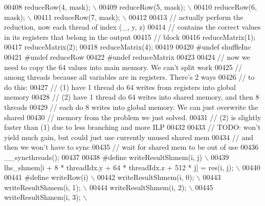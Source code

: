 \begin{DoxyCode}
00408 \textcolor{preprocessor}{  reduceRow(4, mask);                           \(\backslash\)}
00409 \textcolor{preprocessor}{  reduceRow(5, mask);                           \(\backslash\)}
00410 \textcolor{preprocessor}{  reduceRow(6, mask);                           \(\backslash\)}
00411 \textcolor{preprocessor}{  reduceRow(7, mask);                           \(\backslash\)}
00412 \textcolor{preprocessor}{}
00413   \textcolor{comment}{// actually perform the reduction, now each thread of index (\_, y, z)}
00414   \textcolor{comment}{// contains the correct values in its registers that belong in the output}
00415   \textcolor{comment}{// block}
00416   reduceMatrix(1);
00417   reduceMatrix(2);
00418   reduceMatrix(4);
00419 
00420 \textcolor{preprocessor}{#undef shuffleInc}
00421 \textcolor{preprocessor}{#undef reduceRow}
00422 \textcolor{preprocessor}{#undef reduceMatrix}
00423 
00424   \textcolor{comment}{// now we need to copy the 64 values into main memory. We can't split work}
00425   \textcolor{comment}{// among threads because all variables are in registers. There's 2 ways}
00426   \textcolor{comment}{// to do this:}
00427   \textcolor{comment}{// (1) have 1 thread do 64 writes from registers into global memory}
00428   \textcolor{comment}{// (2) have 1 thread do 64 writes into shared memory, and then 8 threads}
00429   \textcolor{comment}{//     each do 8 writes into global memory. We can just overwrite the shared}
00430   \textcolor{comment}{//     memory from the problem we just solved.}
00431   \textcolor{comment}{// (2) is slightly faster than (1) due to less branching and more ILP}
00432 
00433   \textcolor{comment}{// TODO: won't yield much gain, but could just use currently unused shared mem}
00434   \textcolor{comment}{//       and then we won't have to sync}
00435   \textcolor{comment}{// wait for shared mem to be out of use}
00436   \_\_syncthreads();
00437 
00438 \textcolor{preprocessor}{#define writeResultShmem(i, j)                                          \(\backslash\)}
00439 \textcolor{preprocessor}{  lhs\_shmem[i + 8 * threadIdx.y + 64 * threadIdx.z + 512 * j] = res(i, j); \(\backslash\)}
00440 \textcolor{preprocessor}{}
00441 \textcolor{preprocessor}{#define writeRow(i)                             \(\backslash\)}
00442 \textcolor{preprocessor}{  writeResultShmem(i, 0);                       \(\backslash\)}
00443 \textcolor{preprocessor}{  writeResultShmem(i, 1);                       \(\backslash\)}
00444 \textcolor{preprocessor}{  writeResultShmem(i, 2);                       \(\backslash\)}
00445 \textcolor{preprocessor}{  writeResultShmem(i, 3);                       \(\backslash\)}

\end{DoxyCode}
